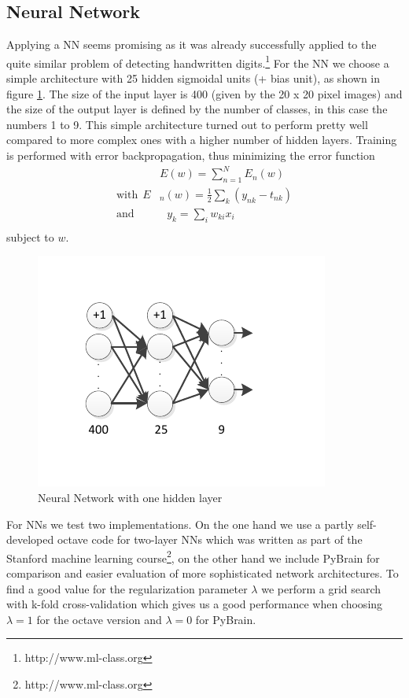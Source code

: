 \documentclass{article}
\begin{document}
\subsection{Neural Network}
Applying a NN seems promising as it was already successfully applied to the quite similar problem of detecting handwritten digits.\footnote{http://www.ml-class.org} For the NN we choose a simple architecture with 25 hidden sigmoidal units (+ bias unit), as shown in figure \ref{fig:nn}. The size of the input layer is 400 (given by the 20 x 20 pixel images) and the size of the output layer is defined by the number of classes, in this case the numbers 1 to 9. This simple architecture turned out to perform pretty well compared to more complex ones with a higher number of hidden layers. Training is performed with error backpropagation, thus minimizing the error function
\begin{align*}
& E(w) = \sum_{n=1}^N E_n(w)\\
\text{with}~~E&_n(w) = \frac{1}{2}\sum_k (y_{nk}-t_{nk})\\
\text{and}~~~~~&~~~y_k = \sum_i w_{ki}x_{i}\\
\end{align*}
subject to $w$.
\begin{figure}[ht]
	\centerline{\includegraphics[width=\columnwidth, trim=0 30 0 30]{../nn}}
	\caption{Neural Network with one hidden layer}
	\label{fig:nn}
\end{figure}
For NNs we test two implementations. On the one hand we use a partly self-developed octave code for two-layer NNs which was written as part of the Stanford machine learning course\footnote{http://www.ml-class.org}, on the other hand we include PyBrain \cite{schaul2010pybrain} for comparison and easier evaluation of more sophisticated network architectures. To find a good value for the regularization parameter $\lambda$ we perform a grid search with k-fold cross-validation which gives us a good performance when choosing $\lambda = 1$ for the octave version and $\lambda = 0$ for PyBrain.
\end{document}
